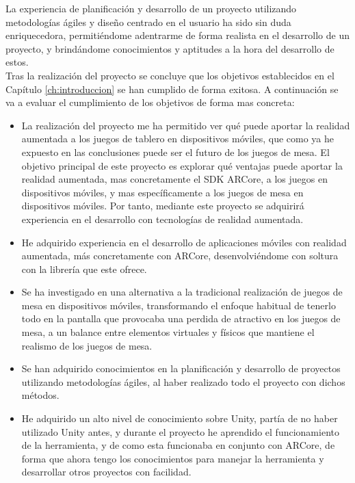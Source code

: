 La experiencia de planificación y desarrollo de un proyecto utilizando metodologías ágiles y diseño centrado en el usuario ha sido sin duda enriquecedora, permitiéndome adentrarme de forma realista en el desarrollo de un proyecto, y brindándome conocimientos y aptitudes a la hora del desarrollo de estos.\\

Tras la realización del proyecto se concluye que los objetivos establecidos en el Capítulo \ref{ch:introduccion} se han cumplido de forma exitosa. A continuación se va a evaluar el cumplimiento de los objetivos de forma mas concreta:

\begin{itemize}
  \item La realización del proyecto me ha permitido ver qué puede aportar la realidad aumentada a los juegos de tablero en dispositivos móviles, que como ya he expuesto en las conclusiones puede ser el futuro de los juegos de mesa. El objetivo principal de este proyecto es explorar qué ventajas puede aportar la realidad aumentada, mas concretamente el SDK ARCore, a los juegos en dispositivos móviles, y mas específicamente a los juegos de mesa en dispositivos móviles. Por tanto, mediante este proyecto se adquirirá experiencia en el desarrollo con tecnologías de realidad aumentada.

  \item He adquirido experiencia en el desarrollo de aplicaciones móviles con realidad aumentada, más concretamente con ARCore, desenvolviéndome con soltura con la librería que este ofrece.

  \item Se ha investigado en una alternativa a la tradicional realización de juegos de mesa en dispositivos móviles, transformando el enfoque habitual de tenerlo todo en la pantalla que provocaba una perdida de atractivo en los juegos de mesa, a un balance entre elementos virtuales y físicos que mantiene el realismo de los juegos de mesa.

  \item Se han adquirido conocimientos en la planificación y desarrollo de proyectos utilizando metodologías ágiles, al haber realizado todo el proyecto con dichos métodos.

  \item He adquirido un alto nivel de conocimiento sobre Unity, partía de no haber utilizado Unity antes, y durante el proyecto he aprendido el funcionamiento de la herramienta, y de como esta funcionaba en conjunto con ARCore, de forma que ahora tengo los conocimientos para manejar la herramienta y desarrollar otros proyectos con facilidad.


\end{itemize}
